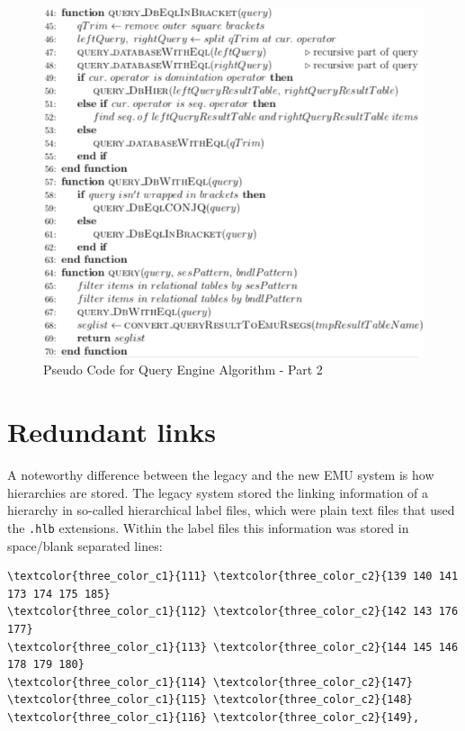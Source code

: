 \documentclass[]{book}
\theoremstyle{definition}
\theoremstyle{definition}
\theoremstyle{definition}
\theoremstyle{remark}
\begin{document}
\begin{figure}

{\centering \includegraphics[width=0.9\linewidth]{pics/algorithm2} 

}

\caption{Pseudo Code for Query Engine Algorithm - Part 2}\label{fig:query-implQueryEnginePC-p2}
\end{figure}

\hypertarget{subsec:query-redundantLinks}{%
\section{Redundant links}\label{subsec:query-redundantLinks}}

A noteworthy difference between the legacy and the new EMU system is how
hierarchies are stored. The legacy system stored the linking information
of a hierarchy in so-called hierarchical label files, which were plain
text files that used the \texttt{.hlb} extensions. Within the label
files this information was stored in space/blank separated lines:

\begin{verbatim}
\textcolor{three_color_c1}{111} \textcolor{three_color_c2}{139 140 141 173 174 175 185}
\textcolor{three_color_c1}{112} \textcolor{three_color_c2}{142 143 176 177}
\textcolor{three_color_c1}{113} \textcolor{three_color_c2}{144 145 146 178 179 180}
\textcolor{three_color_c1}{114} \textcolor{three_color_c2}{147}
\textcolor{three_color_c1}{115} \textcolor{three_color_c2}{148}
\textcolor{three_color_c1}{116} \textcolor{three_color_c2}{149},
\end{verbatim}
\end{document}
